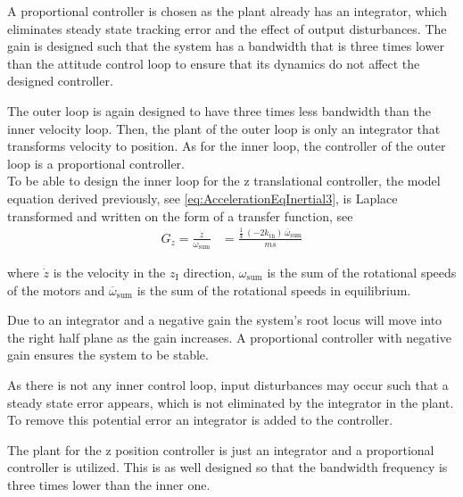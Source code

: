 A proportional controller is chosen as the plant already has an integrator, which eliminates steady state tracking error and the effect of output disturbances. The gain is designed such that the system has a bandwidth that is three times lower than the attitude control loop to ensure that its dynamics do not affect the designed controller. %

The outer loop is again designed to have three times less bandwidth than the inner velocity loop. Then, the plant of the outer loop is only an integrator that transforms velocity to position. As for the inner loop, the controller of the outer loop is a proportional controller. \\

To be able to design the inner loop for the z translational controller, the model equation derived previously, see \eqref{eq:AccelerationEqInertial3}, is Laplace transformed and written on the form of a transfer function, see
%
\begin{align}
G_{\dot{z}}=\frac{\dot{z}}{\omega_{\mathrm{sum}}} &= \frac{ \frac{1}{4}\ (-2 k_{\mathrm{th}})\ \overline{\omega}_{\mathrm{sum}} }{ m s }\label{eq:linearTransferFunctionZ}
\end{align}

\noindent where $\dot{z}$ is the velocity in the $z_{\mathrm{I}}$ direction, $\omega_{\mathrm{sum}}$ is the sum of the rotational speeds of the motors and $\overline{\omega}_{\mathrm{sum}}$ is the sum of the rotational speeds in equilibrium.

Due to an integrator and a negative gain the system's root locus will move into the right half plane as the gain increases. A proportional controller with negative gain ensures the system to be stable. 

As there is not any inner control loop, input disturbances may occur such that a steady state error appears, which is not eliminated by the integrator in the plant. To remove this potential error an integrator is added to the controller. 

The plant for the z position controller is just an integrator and a proportional controller is utilized. This is as well designed so that the bandwidth frequency is three times lower than the inner one.
